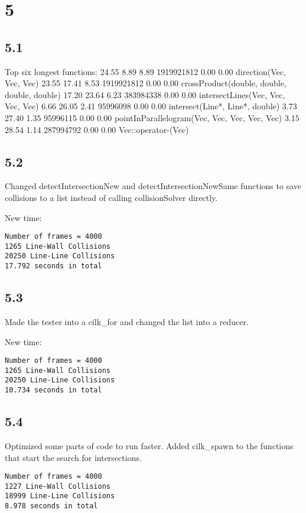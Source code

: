 \documentclass[12pt]{article}
\begin{document}
\section{5}
\subsection{5.1}
Top six longest functions:
  24.55      8.89     8.89 1919921812     0.00     0.00  direction(Vec, Vec, Vec)
  23.55     17.41     8.53 1919921812     0.00     0.00  crossProduct(double, double, double, double)
  17.20     23.64     6.23 383984338     0.00     0.00  intersectLines(Vec, Vec, Vec, Vec)
   6.66     26.05     2.41 95996098     0.00     0.00  intersect(Line*, Line*, double)
   3.73     27.40     1.35 95996115     0.00     0.00  pointInParallelogram(Vec, Vec, Vec, Vec, Vec)
   3.15     28.54     1.14 287994792     0.00     0.00  Vec::operator-(Vec)


\subsection{5.2}
Changed detectIntersectionNew and detectIntersectionNewSame functions to save 
collisions to a list instead of calling collisionSolver directly.  

New time:
\begin{verbatim}
Number of frames = 4000
1265 Line-Wall Collisions
20250 Line-Line Collisions
17.792 seconds in total
\end{verbatim}


\subsection{5.3}
Made the tester into a cilk_for and changed the list into a reducer.  

New time:
\begin{verbatim}
Number of frames = 4000
1265 Line-Wall Collisions
20250 Line-Line Collisions
10.734 seconds in total
\end{verbatim}


\subsection{5.4}
Optimized some parts of code to run faster.  
Added cilk_spawn to the functions that start the search for intersections.  
\begin{verbatim}
Number of frames = 4000
1227 Line-Wall Collisions
18999 Line-Line Collisions
8.978 seconds in total
\end{verbatim}
\end{document}
